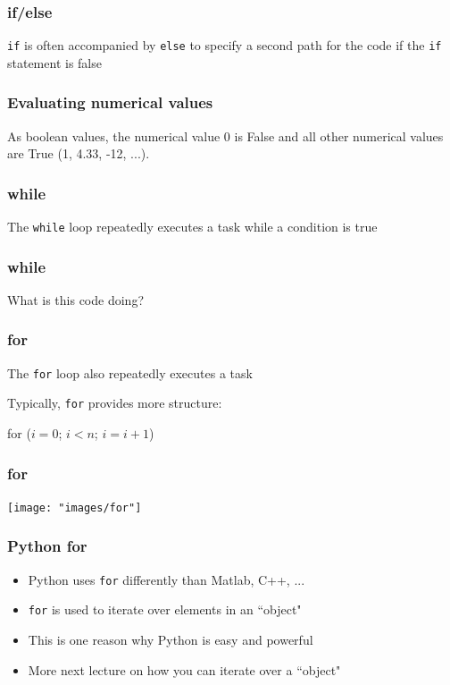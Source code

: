 \documentclass{beamer}
\begin{document}
\begin{frame}
\frametitle{if/else}
\texttt{if} is often accompanied by \texttt{else} to specify a second path for the code if the \texttt{if} statement is false



\end{frame}

\begin{frame}
\frametitle{Evaluating numerical values}

As boolean values, the numerical value 0 is False and all other numerical values are True (1, 4.33, -12, ...).



\end{frame}

\begin{frame}
\frametitle{while}
The \texttt{while} loop repeatedly executes a task while a condition is true


\end{frame}

\begin{frame}
\frametitle{while}


What is this code doing?


\end{frame}

\begin{frame}
\frametitle{for}
The \texttt{for} loop also repeatedly executes a task

\vspace{0.1in}

Typically, \texttt{for} provides more structure:

\vspace{0.1in}

\centering
for ($i = 0$; $i < n$; $i = i + 1$)

\end{frame}

\begin{frame}
\frametitle{for}

\centering
\texttt{[image: "images/for"]}
\end{frame}

\begin{frame}
\frametitle{Python for}
\begin{itemize}
\setlength{\itemsep}{0.2in}
\item{Python uses \texttt{for} differently than Matlab, C++, ...}
\item{\texttt{for} is used to iterate over elements in an ``object"}
\item{This is one reason why Python is easy and powerful}
\item{More next lecture on how you can iterate over a ``object"}
\end{itemize}

\end{frame}
\end{document}
